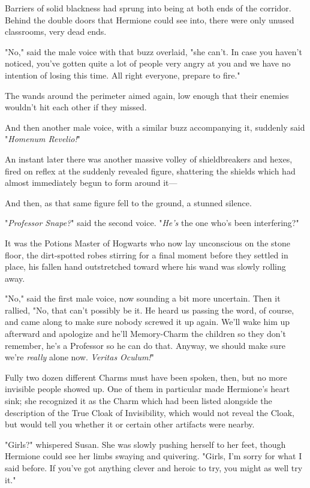 Barriers of solid blackness had sprung into being at both ends of the corridor.
Behind the double doors that Hermione could see into, there were only unused
classrooms, very dead ends.

"No," said the male voice with that buzz overlaid, "she can't. In case you
haven't noticed, you've gotten quite a lot of people very angry at you and we
have no intention of losing this time. All right everyone, prepare to fire."

The wands around the perimeter aimed again, low enough that their enemies
wouldn't hit each other if they missed.

And then another male voice, with a similar buzz accompanying it, suddenly said
"\emph{Homenum Revelio!}"

An instant later there was another massive volley of shieldbreakers and hexes,
fired on reflex at the suddenly revealed figure, shattering the shields which
had almost immediately begun to form around it---

And then, as that same figure fell to the ground, a stunned silence.

"\emph{Professor Snape?}" said the second voice. "\emph{He's} the one who's
been interfering?"

It was the Potions Master of Hogwarts who now lay unconscious on the stone
floor, the dirt-spotted robes stirring for a final moment before they settled
in place, his fallen hand outstretched toward where his wand was slowly rolling
away.

"No," said the first male voice, now sounding a bit more uncertain. Then it
rallied, "No, that can't possibly be it. He heard us passing the word, of
course, and came along to make sure nobody screwed it up again. We'll wake him
up afterward and apologize and he'll Memory-Charm the children so they don't
remember, he's a Professor so he can do that. Anyway, we should make sure we're
\emph{really} alone now. \emph{Veritas Oculum!}"

Fully two dozen different Charms must have been spoken, then, but no more
invisible people showed up. One of them in particular made Hermione's heart
sink; she recognized it as the Charm which had been listed alongside the
description of the True Cloak of Invisibility, which would not reveal the
Cloak, but would tell you whether it or certain other artifacts were nearby.

"Girls?" whispered Susan. She was slowly pushing herself to her feet, though
Hermione could see her limbs swaying and quivering. "Girls, I'm sorry for what
I said before. If you've got anything clever and heroic to try, you might as
well try it."

